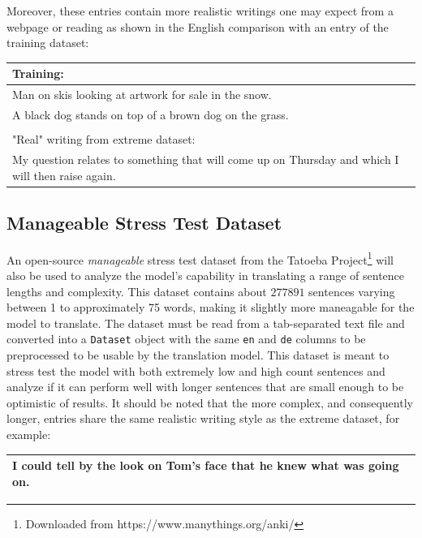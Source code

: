 \documentclass[11pt,a4paper]{article}
\begin{document}
Moreover, these entries contain more realistic writings one may expect from a webpage or reading as shown in the English comparison with an entry of the training dataset:

\begin{center}
\begin{tabular}{p{2.5in}}
    Training:\\
    \hline
    Man on skis looking at artwork for sale in the snow.\\
    A black dog stands on top of a brown dog on the grass.\\
    \hline
    \\
    "Real" writing from extreme dataset:\\
    \hline
    My question relates to something that will come up on Thursday and which I will then raise again.\\
    \hline
\end{tabular}
\end{center}

\subsection{Manageable Stress Test Dataset}
An open-source \textit{manageable} stress test dataset from the Tatoeba Project\footnote{Downloaded from https://www.manythings.org/anki/} \cite{anki} will also be used to analyze the model's capability in translating a range of sentence lengths and complexity. This dataset contains about $277891$ sentences varying between 1 to approximately 75 words, making it slightly more maneagable for the model to translate. The dataset must be read from a tab-separated text file and converted into a \verb|Dataset| object with the same \verb|en| and \verb|de| columns to be preprocessed to be usable by the translation model. This dataset is meant to stress test the model with both extremely low and high count sentences and analyze if it can perform well with longer sentences that are small enough to be optimistic of results. It should be noted that the more complex, and consequently longer, entries share the same realistic writing style as the extreme dataset, for example:
\begin{center}
\begin{tabular}{p{2.5in}}
    \hline
    I could tell by the look on Tom's face that he knew what was going on.\\
    \hline
\end{tabular}
\end{center}
\end{document}
